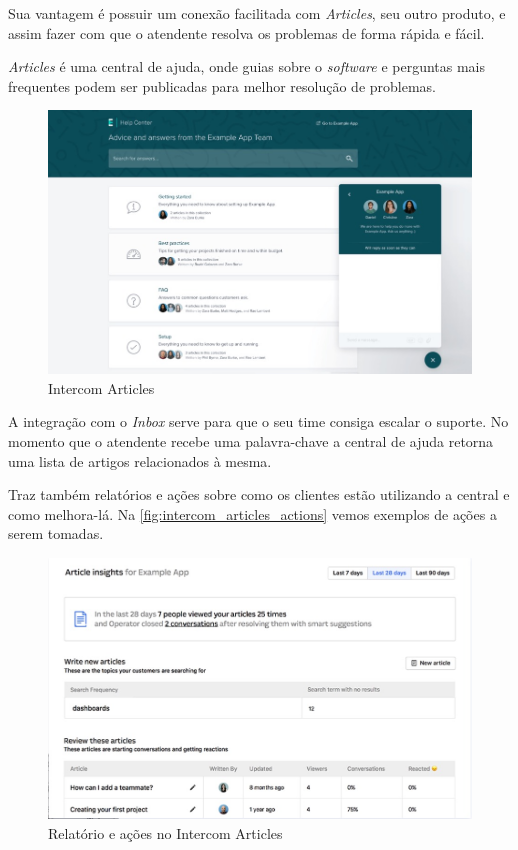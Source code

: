 Sua vantagem é possuir um conexão facilitada com \textit{Articles}, seu outro produto, e assim fazer com que o atendente resolva os problemas de forma rápida e fácil.

\textit{Articles} é uma central de ajuda, onde guias sobre o \textit{software} e perguntas mais frequentes podem ser publicadas para melhor resolução de problemas. 

\begin{figure}[ht!]
	\centering 
		\includegraphics[scale=0.4]{figures/intercom-articles.jpg} 
	\caption{Intercom Articles}
	\label{fig:intercom_articles}
\end{figure}

A integração com o \textit{Inbox} serve para que o seu time consiga escalar o suporte. No momento que o atendente recebe uma palavra-chave a central de ajuda retorna uma lista de artigos relacionados à mesma. 

Traz também relatórios e ações sobre como os clientes estão utilizando a central e como melhora-lá. Na \autoref{fig:intercom_articles_actions} vemos exemplos de ações a serem tomadas.

\begin{figure}[ht!]
	\centering 
		\includegraphics[scale=0.4]{figures/intercom-articles-actions.jpg} 
	\caption{Relatório e ações no Intercom Articles}
	\label{fig:intercom_articles_actions}
\end{figure}

